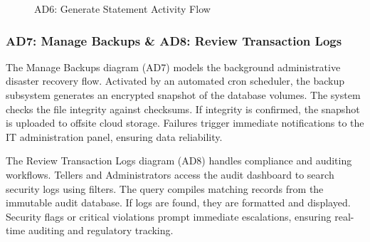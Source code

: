 \documentclass[11pt,a4paper]{article}
\begin{document}
\begin{figure}[H]
\begin{minipage}{0.48\textwidth}
  \caption{AD6: Generate Statement Activity Flow}
\end{minipage}
\end{figure}

\newpage

\subsubsection{AD7: Manage Backups \& AD8: Review Transaction Logs}
The Manage Backups diagram (AD7) models the background administrative disaster recovery flow. Activated by an automated cron scheduler, the backup subsystem generates an encrypted snapshot of the database volumes. The system checks the file integrity against checksums. If integrity is confirmed, the snapshot is uploaded to offsite cloud storage. Failures trigger immediate notifications to the IT administration panel, ensuring data reliability.

The Review Transaction Logs diagram (AD8) handles compliance and auditing workflows. Tellers and Administrators access the audit dashboard to search security logs using filters. The query compiles matching records from the immutable audit database. If logs are found, they are formatted and displayed. Security flags or critical violations prompt immediate escalations, ensuring real-time auditing and regulatory tracking.
\end{document}
